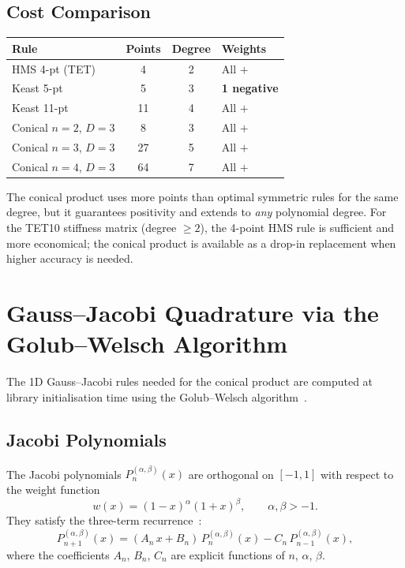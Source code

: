 \subsection{Cost Comparison}

\begin{center}
\begin{tabular}{lccl}
  \toprule
  Rule & Points & Degree & Weights \\
  \midrule
  HMS 4-pt (TET)          & 4    & 2 & All $+$ \\
  Keast 5-pt              & 5    & 3 & \textbf{1 negative} \\
  Keast 11-pt             & 11   & 4 & All $+$ \\
  Conical $n\!=\!2$, $D\!=\!3$ & 8   & 3 & All $+$ \\
  Conical $n\!=\!3$, $D\!=\!3$ & 27  & 5 & All $+$ \\
  Conical $n\!=\!4$, $D\!=\!3$ & 64  & 7 & All $+$ \\
  \bottomrule
\end{tabular}
\end{center}

The conical product uses more points than optimal symmetric rules for the same
degree, but it guarantees positivity and extends to \emph{any} polynomial
degree.  For the TET10 stiffness matrix (degree $\ge 2$), the 4-point HMS rule
is sufficient and more economical; the conical product is available as a
drop-in replacement when higher accuracy is needed.


\section{Gauss--Jacobi Quadrature via the Golub--Welsch Algorithm}
\label{sec:golub_welsch}

The 1D Gauss--Jacobi rules needed for the conical product are computed at
library initialisation time using the Golub--Welsch
algorithm~\cite{GolubWelsch1969}.

\subsection{Jacobi Polynomials}
\label{sec:jacobi_poly}

The Jacobi polynomials $P_n^{(\alpha,\beta)}(x)$ are orthogonal on $[-1,1]$
with respect to the weight function
\begin{equation}
  w(x) = (1 - x)^\alpha (1 + x)^\beta, \qquad \alpha, \beta > -1.
  \label{eq:jacobi_weight}
\end{equation}
They satisfy the three-term recurrence~\cite{Szego1975,Gautschi2004}:
\begin{equation}
  P_{n+1}^{(\alpha,\beta)}(x)
  = (A_n\, x + B_n)\, P_n^{(\alpha,\beta)}(x)
  - C_n\, P_{n-1}^{(\alpha,\beta)}(x),
  \label{eq:3term_recurrence}
\end{equation}
where the coefficients $A_n$, $B_n$, $C_n$ are explicit functions of $n$,
$\alpha$, $\beta$.

